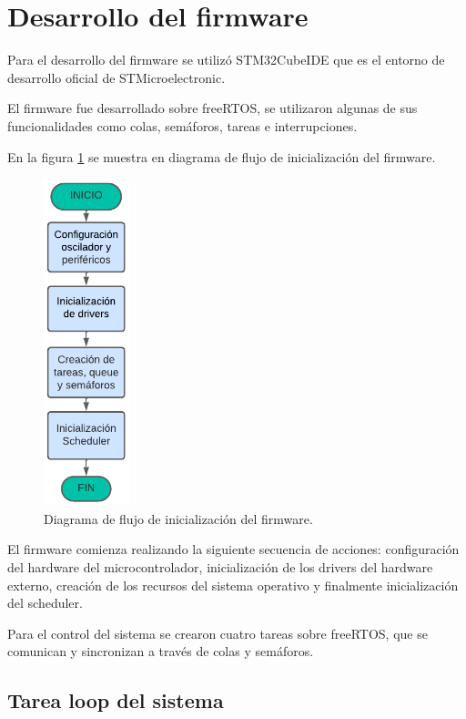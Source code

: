 \section{Desarrollo del firmware}

Para el desarrollo del firmware se utilizó STM32CubeIDE que es el entorno de desarrollo oficial de STMicroelectronic.

El firmware fue desarrollado sobre freeRTOS, se utilizaron algunas de sus funcionalidades como colas, semáforos, tareas e interrupciones.

En la figura \ref{fig:Df inicio firmware}  se muestra en diagrama de flujo de inicialización del firmware.

\begin{figure}[htbp]
  \centering
	\includegraphics[width=2.5cm, height=9.5cm]{./Figures/DF inicio firmware.png}
	\caption{Diagrama de flujo de inicialización del firmware.}
	\label{fig:Df inicio firmware}
\end{figure}

El firmware comienza realizando la siguiente secuencia de acciones: configuración del hardware del microcontrolador, inicialización de los drivers del hardware externo, creación de los recursos del sistema operativo y finalmente inicialización del scheduler.

Para el control del sistema se crearon cuatro tareas sobre freeRTOS, que se comunican y sincronizan a través de colas y semáforos.

\subsection{Tarea loop del sistema} 

